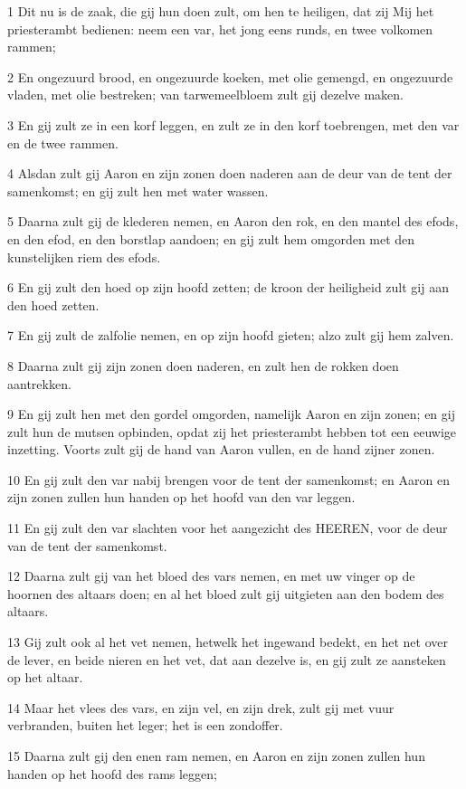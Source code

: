 \par 1 Dit nu is de zaak, die gij hun doen zult, om hen te heiligen, dat zij Mij het priesterambt bedienen: neem een var, het jong eens runds, en twee volkomen rammen;
\par 2 En ongezuurd brood, en ongezuurde koeken, met olie gemengd, en ongezuurde vladen, met olie bestreken; van tarwemeelbloem zult gij dezelve maken.
\par 3 En gij zult ze in een korf leggen, en zult ze in den korf toebrengen, met den var en de twee rammen.
\par 4 Alsdan zult gij Aaron en zijn zonen doen naderen aan de deur van de tent der samenkomst; en gij zult hen met water wassen.
\par 5 Daarna zult gij de klederen nemen, en Aaron den rok, en den mantel des efods, en den efod, en den borstlap aandoen; en gij zult hem omgorden met den kunstelijken riem des efods.
\par 6 En gij zult den hoed op zijn hoofd zetten; de kroon der heiligheid zult gij aan den hoed zetten.
\par 7 En gij zult de zalfolie nemen, en op zijn hoofd gieten; alzo zult gij hem zalven.
\par 8 Daarna zult gij zijn zonen doen naderen, en zult hen de rokken doen aantrekken.
\par 9 En gij zult hen met den gordel omgorden, namelijk Aaron en zijn zonen; en gij zult hun de mutsen opbinden, opdat zij het priesterambt hebben tot een eeuwige inzetting. Voorts zult gij de hand van Aaron vullen, en de hand zijner zonen.
\par 10 En gij zult den var nabij brengen voor de tent der samenkomst; en Aaron en zijn zonen zullen hun handen op het hoofd van den var leggen.
\par 11 En gij zult den var slachten voor het aangezicht des HEEREN, voor de deur van de tent der samenkomst.
\par 12 Daarna zult gij van het bloed des vars nemen, en met uw vinger op de hoornen des altaars doen; en al het bloed zult gij uitgieten aan den bodem des altaars.
\par 13 Gij zult ook al het vet nemen, hetwelk het ingewand bedekt, en het net over de lever, en beide nieren en het vet, dat aan dezelve is, en gij zult ze aansteken op het altaar.
\par 14 Maar het vlees des vars, en zijn vel, en zijn drek, zult gij met vuur verbranden, buiten het leger; het is een zondoffer.
\par 15 Daarna zult gij den enen ram nemen, en Aaron en zijn zonen zullen hun handen op het hoofd des rams leggen;
